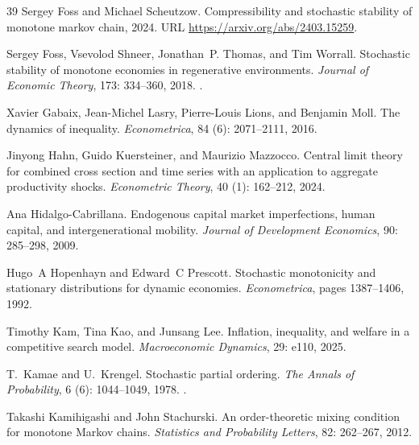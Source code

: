 \documentclass[12pt,reqno]{amsart}
\numberwithin{equation}{section}
\theoremstyle{definition}
\newcommand{\1}{\mathbbm{1}}
\begin{document}
\begin{thebibliography}{39}
Sergey Foss and Michael Scheutzow.
\newblock Compressibility and stochastic stability of monotone markov chain, 2024.
\newblock URL \url{https://arxiv.org/abs/2403.15259}.

Sergey Foss, Vsevolod Shneer, Jonathan~P. Thomas, and Tim Worrall.
\newblock Stochastic stability of monotone economies in regenerative environments.
\newblock \emph{Journal of Economic Theory}, 173: 334--360, 2018.
\newblock {}.

Xavier Gabaix, Jean-Michel Lasry, Pierre-Louis Lions, and Benjamin Moll.
\newblock The dynamics of inequality.
\newblock \emph{Econometrica}, 84 (6): 2071--2111, 2016.

Jinyong Hahn, Guido Kuersteiner, and Maurizio Mazzocco.
\newblock Central limit theory for combined cross section and time series with an application to aggregate productivity shocks.
\newblock \emph{Econometric Theory}, 40 (1): 162--212, 2024.

Ana Hidalgo-Cabrillana.
\newblock Endogenous capital market imperfections, human capital, and intergenerational mobility.
\newblock \emph{Journal of Development Economics}, 90: 285--298, 2009.

Hugo~A Hopenhayn and Edward~C Prescott.
\newblock Stochastic monotonicity and stationary distributions for dynamic economies.
\newblock \emph{Econometrica}, pages 1387--1406, 1992.

Timothy Kam, Tina Kao, and Junsang Lee.
\newblock Inflation, inequality, and welfare in a competitive search model.
\newblock \emph{Macroeconomic Dynamics}, 29: e110, 2025.

T.~Kamae and U.~Krengel.
\newblock Stochastic partial ordering.
\newblock \emph{The Annals of Probability}, 6 (6): 1044--1049, 1978.
\newblock {}.

Takashi Kamihigashi and John Stachurski.
\newblock An order-theoretic mixing condition for monotone {M}arkov chains.
\newblock \emph{Statistics and Probability Letters}, 82: 262--267, 2012.


\end{thebibliography}
\end{document}
